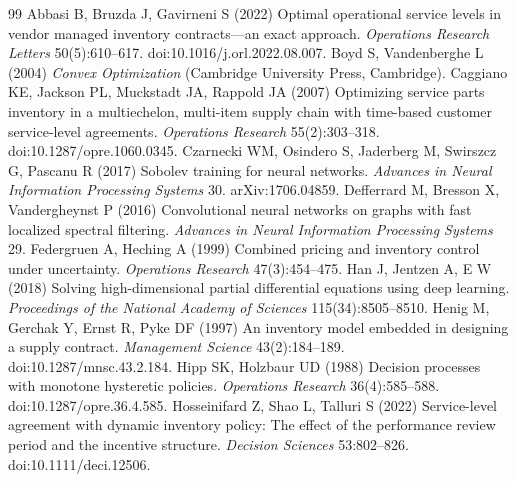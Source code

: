 \begin{thebibliography}{99}
Abbasi B, Bruzda J, Gavirneni S (2022) Optimal operational service levels in vendor managed inventory contracts---an exact approach. \emph{Operations Research Letters} 50(5):610--617. doi:10.1016/j.orl.2022.08.007.
Boyd S, Vandenberghe L (2004) \emph{Convex Optimization} (Cambridge University Press, Cambridge).
Caggiano KE, Jackson PL, Muckstadt JA, Rappold JA (2007) Optimizing service parts inventory in a multiechelon, multi-item supply chain with time-based customer service-level agreements. \emph{Operations Research} 55(2):303--318. doi:10.1287/opre.1060.0345.
Czarnecki WM, Osindero S, Jaderberg M, Swirszcz G, Pascanu R (2017) Sobolev training for neural networks. \emph{Advances in Neural Information Processing Systems} 30. arXiv:1706.04859.
Defferrard M, Bresson X, Vandergheynst P (2016) Convolutional neural networks on graphs with fast localized spectral filtering. \emph{Advances in Neural Information Processing Systems} 29.
Federgruen A, Heching A (1999) Combined pricing and inventory control under uncertainty. \emph{Operations Research} 47(3):454--475.
Han J, Jentzen A, E W (2018) Solving high-dimensional partial differential equations using deep learning. \emph{Proceedings of the National Academy of Sciences} 115(34):8505--8510.
Henig M, Gerchak Y, Ernst R, Pyke DF (1997) An inventory model embedded in designing a supply contract. \emph{Management Science} 43(2):184--189. doi:10.1287/mnsc.43.2.184.
Hipp SK, Holzbaur UD (1988) Decision processes with monotone hysteretic policies. \emph{Operations Research} 36(4):585--588. doi:10.1287/opre.36.4.585.
Hosseinifard Z, Shao L, Talluri S (2022) Service-level agreement with dynamic inventory policy: The effect of the performance review period and the incentive structure. \emph{Decision Sciences} 53:802--826. doi:10.1111/deci.12506.

\end{thebibliography}
